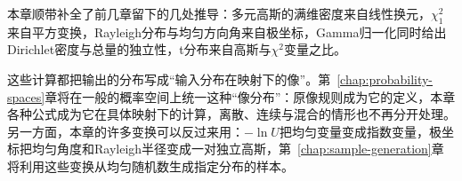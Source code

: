 本章顺带补全了前几章留下的几处推导：多元高斯的满维密度来自线性换元，$\chi^2_1$来自平方变换，Rayleigh分布与均匀方向角来自极坐标，Gamma归一化同时给出Dirichlet密度与总量的独立性，t分布来自高斯与$\chi^2$变量之比。

这些计算都把输出的分布写成“输入分布在映射下的像”。第~\ref{chap:probability-spaces}章将在一般的概率空间上统一这种“像分布”：原像规则成为它的定义，本章各种公式成为它在具体映射下的计算，离散、连续与混合的情形也不再分开处理。另一方面，本章的许多变换可以反过来用：$-\ln U$把均匀变量变成指数变量，极坐标把均匀角度和Rayleigh半径变成一对独立高斯，第~\ref{chap:sample-generation}章将利用这些变换从均匀随机数生成指定分布的样本。
